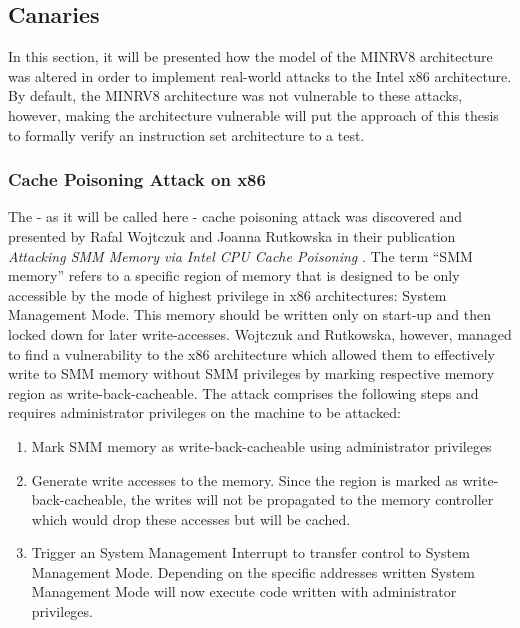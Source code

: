 \subsection{Canaries}
\label{sec:canaries}

In this section, it will be presented how the model of the MINRV8 architecture was altered in order to implement real-world attacks to the Intel x86 architecture.
By default, the MINRV8 architecture was not vulnerable to these attacks, however, making the architecture vulnerable will put the approach of this thesis to formally verify an instruction set architecture to a test.

\subsubsection{Cache Poisoning Attack on x86}

The - as it will be called here - cache poisoning attack was discovered and presented by Rafal Wojtczuk and Joanna Rutkowska in their publication \textit{Attacking SMM Memory via Intel\textsuperscript{\textregistered} CPU Cache Poisoning} \cite{Wojtczuk09}.
The term \enquote{SMM memory} refers to a specific region of memory that is designed to be only accessible by the mode of highest privilege in x86 architectures: System Management Mode.
This memory should be written only on start-up and then locked down for later write-accesses.
Wojtczuk and Rutkowska, however, managed to find a vulnerability to the x86 architecture which allowed them to effectively write to SMM memory without SMM privileges by marking respective memory region as write-back-cacheable.
The attack comprises the following steps and requires administrator privileges on the machine to be attacked:
\begin{enumerate}
    \item Mark SMM memory as write-back-cacheable using administrator privileges
    \item \label{itm:cache-pois-mem}
    Generate write accesses to the memory.
    Since the region is marked as write-back-cacheable, the writes will not be propagated to the memory controller which would drop these accesses but will be cached.
    \item \label{itm:cache-pois-smi}
    Trigger an System Management Interrupt to transfer control to System Management Mode.
    Depending on the specific addresses written System Management Mode will now execute code written with administrator privileges.
\end{enumerate}

